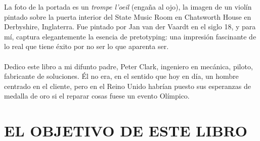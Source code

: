 \documentclass{article}
\begin{document}
La foto de la portada es un \textit{trompe l'oeil} (enga\~na al ojo), la imagen de un viol\'in pintado sobre la puerta interior del State Music Room en Chatsworth House en Derbyshire, Inglaterra.     Fue pintado por Jan van der Vaardt en el siglo 18, y para m\'i, captura elegantemente la esencia de pretotyping: una impresi\'on fascinante de lo real que tiene \'exito por no ser lo que aparenta ser.
\\ \\
Dedico este libro a mi difunto padre, Peter Clark, ingeniero en mec\'anica, piloto, fabricante de soluciones.     \'El no era, en el sentido que hoy en d\'ia, un hombre centrado en el cliente, pero en el Reino Unido habr\'ian puesto sus esperanzas de medalla de oro si el reparar cosas fuese un evento Ol\'impico.


\newpage

\tableofcontents
\clearpage

\section{EL OBJETIVO DE ESTE LIBRO}
\end{document}
